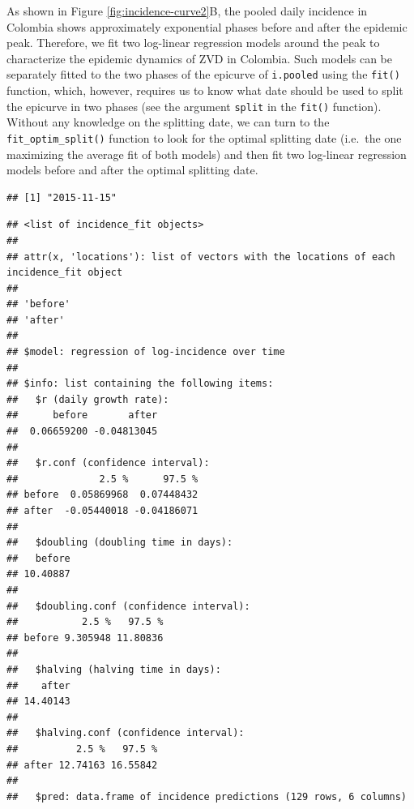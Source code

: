 \documentclass[9pt,a4paper]{extarticle}
\newenvironment{Shaded}{\begin{snugshade}}{\end{snugshade}}
\newcommand{\KeywordTok}[1]{\textcolor[rgb]{0.13,0.29,0.53}{\textbf{#1}}}
\newcommand{\NormalTok}[1]{#1}
\newcommand{\OperatorTok}[1]{\textcolor[rgb]{0.81,0.36,0.00}{\textbf{#1}}}
\newcommand{\StringTok}[1]{\textcolor[rgb]{0.31,0.60,0.02}{#1}}
\begin{document}
As shown in Figure \ref{fig:incidence-curve2}B, the pooled daily incidence in Colombia shows approximately exponential phases before and after the epidemic peak.
Therefore, we fit two log-linear regression models around the peak to characterize the epidemic dynamics of ZVD in Colombia.
Such models can be separately fitted to the two phases of the epicurve of \texttt{i.pooled} using the \texttt{fit()} function, which, however, requires us to know what date should be used to split the epicurve in two phases (see the argument \texttt{split} in the \texttt{fit()} function).
Without any knowledge on the splitting date, we can turn to the \texttt{fit\_optim\_split()} function to look for the optimal splitting date (i.e.~the one maximizing the average fit of both models) and then fit two log-linear regression models before and after the optimal splitting date.


\begin{Shaded}
\end{Shaded}

\begin{verbatim}
## [1] "2015-11-15"
\end{verbatim}

\begin{Shaded}
\end{Shaded}

\begin{verbatim}
## <list of incidence_fit objects>
## 
## attr(x, 'locations'): list of vectors with the locations of each incidence_fit object
## 
## 'before'
## 'after'
## 
## $model: regression of log-incidence over time
## 
## $info: list containing the following items:
##   $r (daily growth rate):
##      before       after 
##  0.06659200 -0.04813045 
## 
##   $r.conf (confidence interval):
##              2.5 %      97.5 %
## before  0.05869968  0.07448432
## after  -0.05440018 -0.04186071
## 
##   $doubling (doubling time in days):
##   before 
## 10.40887 
## 
##   $doubling.conf (confidence interval):
##           2.5 %   97.5 %
## before 9.305948 11.80836
## 
##   $halving (halving time in days):
##    after 
## 14.40143 
## 
##   $halving.conf (confidence interval):
##          2.5 %   97.5 %
## after 12.74163 16.55842
## 
##   $pred: data.frame of incidence predictions (129 rows, 6 columns)
\end{verbatim}
\end{document}
